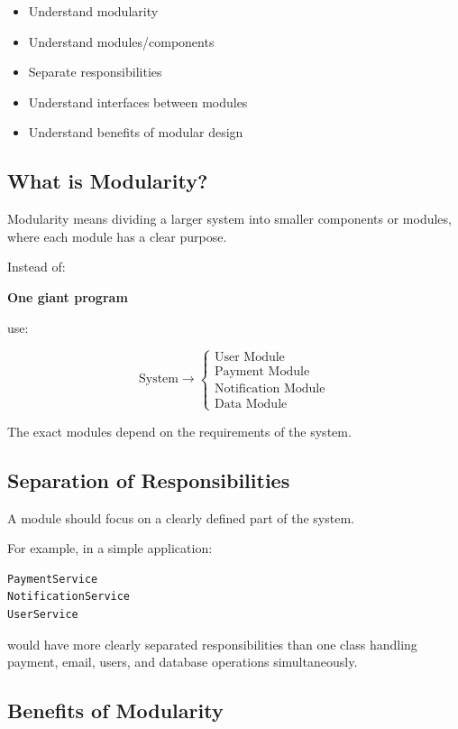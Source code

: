 \documentclass[11pt,a4paper]{article}
\newcommand{\checkitem}{$\square$}
\begin{document}
\begin{itemize}[label=\checkitem]
    \item Understand modularity
    \item Understand modules/components
    \item Separate responsibilities
    \item Understand interfaces between modules
    \item Understand benefits of modular design
\end{itemize}

\subsection{What is Modularity?}

Modularity means dividing a larger system into smaller components or modules,
where each module has a clear purpose.

Instead of:

\begin{center}
\textbf{One giant program}
\end{center}

use:

\[
\text{System}
\rightarrow
\begin{cases}
\text{User Module}\\
\text{Payment Module}\\
\text{Notification Module}\\
\text{Data Module}
\end{cases}
\]

The exact modules depend on the requirements of the system.

\subsection{Separation of Responsibilities}

A module should focus on a clearly defined part of the system.

For example, in a simple application:

\begin{verbatim}
PaymentService
NotificationService
UserService
\end{verbatim}

would have more clearly separated responsibilities than one class handling
payment, email, users, and database operations simultaneously.

\subsection{Benefits of Modularity}
\end{document}
